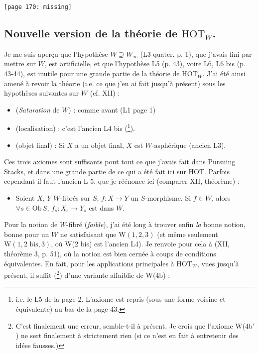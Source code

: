 \documentclass[11pt]{article}
\newcommand{\printedpage}[1]{\marginpar{\footnotesize p.~#1}}
\newcommand{\msp}[1]{\marginpar{\footnotesize [#1]}}
\begin{document}
\msp{page 170: missing}\texttt{[page 170: missing]}

\setcounter{footnote}{81}

\printedpage{104}

\msp{page 171}

\subsection*{Nouvelle version de la théorie de $\mathrm{HOT}_W$.}

Je me suis aperçu que l'hypothèse $W \supseteq W_\infty$ (L3 quater, p. 1), que j'avais fini par mettre sur $W$, est artificielle, et que l'hypothèse L5 (p. 43), voire L6, L6 bis (p. 43-44), est inutile pour une grande partie de la théorie de $\mathrm{HOT}_W$. J'ai été ainsi amené à revoir la théorie (i.e. ce que j'en ai fait jusqu'à présent) sous les hypothèses suivantes sur $W$ (cf. XII) :

\begin{itemize}[leftmargin=4em]
\item[W(1)] (\textit{Saturation} de $W$) : comme avant (L1 page 1)
\item[W(2)] (localisation) : c'est l'ancien L4 bis (\footnote{i.e. le L5 de la page 2. L'axiome est repris (sous une forme voisine et équivalente) au bas de la page 43.}).
\item[W(3)] (objet final) : Si $X$ a un objet final, $X$ est $W$-asphérique (ancien L3).
\end{itemize}

Ces trois axiomes sont suffisants pout tout ce que j'avais fait dans Pursuing Stacks, et dans une grande partie de ce qui a été fait ici sur HOT. Parfois cependant il faut l'ancien L 5, que je réénonce ici (comparer XII, théorème) : %

\begin{itemize}[leftmargin=4em]
\item[W(4b)] Soient $X$, $Y$ $W$-fibrés sur $S$, $f : X \longrightarrow Y$ un $S$-morphisme. Si $f \in W$, alors $\forall s \in \mathrm{Ob}\, S$, $f_s : X_s \longrightarrow Y_s$ est dans $W$.
\end{itemize}

Pour la notion de $W$-fibré (\textit{faible}), j'ai été long à trouver enfin \textit{la} bonne notion, bonne pour un $W$ ne satisfaisant que $\mathrm{W}(1,2,3)$ (et même seulement $\mathrm{W}(1, 2 \text{ bis}, 3)$, où W(2 bis) est l'ancien L4). Je renvoie pour cela à (XII, théorème 3, p. 51), où la notion est bien cernée à coups de conditions équivalentes. En fait, pour les applications principales à $\mathrm{HOT}_W$, vues jusqu'à présent, il suffit (\footnote{C'est finalement une erreur, semble-t-il à présent. Je crois que l'axiome W(4b$'$) ne sert finalement à strictement rien (si ce n'est en fait à entretenir des idées fausses.)}) d'une variante affaiblie de W(4b) :
\end{document}
